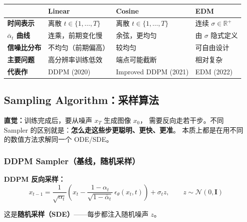 \begin{table}[h]
\centering
\renewcommand{\arraystretch}{1.35}
\begin{tabular}{p{2.8cm}p{3.5cm}p{3.5cm}p{3.5cm}}
\hline
 & \textbf{Linear} & \textbf{Cosine} & \textbf{EDM} \\
\hline
\textbf{时间表示}   & 离散 $t \in \{1,\ldots,T\}$ & 离散 $t \in \{1,\ldots,T\}$ & 连续 $\sigma \in \mathbb{R}^+$ \\
\textbf{$\bar\alpha_t$ 曲线} & 连乘，前期变化慢 & 余弦，更均匀 & 由 $\sigma$ 隐式定义 \\
\textbf{信噪比分布} & 不均匀（前期偏高） & 较均匀 & 可自由设计 \\
\textbf{主要问题}   & 高分辨率训练低效 & 端点可能截断 & 相对复杂 \\
\textbf{代表作}     & DDPM (2020) & Improved DDPM (2021) & EDM (2022) \\
\hline
\end{tabular}
\end{table}

\subsection{Sampling Algorithm：采样算法}

\begin{intubox}
\textbf{直觉：}训练完成后，要从噪声 $x_T$ 生成图像 $x_0$，
需要反向走若干步。不同 Sampler 的区别就是：\textbf{怎么走这些步更聪明、更快、更准}。
本质上都是在用不同的数值方法求解同一个 ODE/SDE。
\end{intubox}

\subsubsection{DDPM Sampler（基线，随机采样）}

\begin{conceptbox}
\textbf{DDPM 反向采样：}
$$x_{t-1} = \frac{1}{\sqrt{\alpha_t}}\!\left(
  x_t - \frac{1-\alpha_t}{\sqrt{1-\bar\alpha_t}}\,\epsilon_\theta(x_t, t)
\right) + \sigma_t z, \qquad z \sim \mathcal{N}(0,\mathbf{I})$$
\end{conceptbox}

这是\textbf{随机采样（SDE）}——每步都注入随机噪声 $z$。

